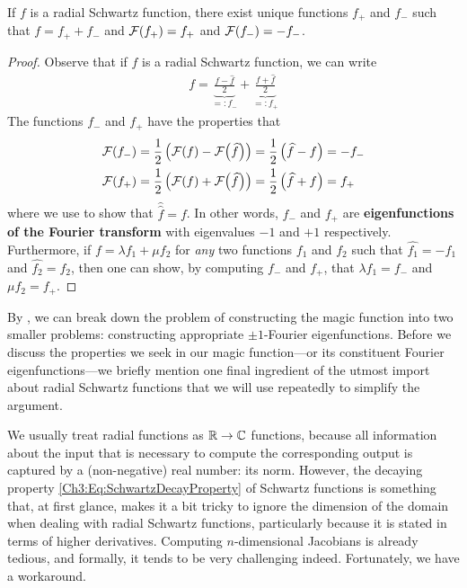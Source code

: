 \begin{boxtheorem}\label{Ch3:Thm:RadialSchwartz_eq_unique_sum_pm1_eigfun}
    If $f$ is a radial Schwartz function, there exist unique functions $f_+$ and $f_-$ such that $f = f_+ + f_-$ and $\mathcal{F}\!\left( f_+ \right) = f_+$ and $\mathcal{F}\!\left( f_- \right) = -f_-$.
\end{boxtheorem}
\begin{proof}
    Observe that if $f$ is a radial Schwartz function, we can write
    \begin{align*}
        f = \underbrace{\frac{f - \hat{f}}{2}}_{=: f_{-}} + \underbrace{\frac{f + \hat{f}}{2}}_{=: f_{+}}
    \end{align*}
    The functions $f_{-}$ and $f_{+}$ have the properties that
    \begin{align*}
        \mathcal{F}\!\left( f_{-} \right) &= \frac{1}{2} \left( \mathcal{F}\!\left( f \right) - \mathcal{F}\!\left( \widehat{f} \right) \right) = \frac{1}{2} \left( \widehat{f} - f \right) = -f_{-} \\
        \mathcal{F}\!\left( f_{+} \right) &= \frac{1}{2} \left( \mathcal{F}\!\left( f \right) + \mathcal{F}\!\left( \widehat{f} \right) \right) = \frac{1}{2} \left( \widehat{f} + f \right) = f_{+}
    \end{align*}
    where we use  to show that $\hat{\hat{f}} = f$. In other words, $f_{-}$ and $f_{+}$ are \textbf{eigenfunctions of the Fourier transform} with eigenvalues $-1$ and $+1$ respectively. Furthermore, if $f = \lambda f_1 + \mu f_2$ for \textit{any} two functions $f_1$ and $f_2$ such that $\hat{f_1} = -f_1$ and $\hat{f_2} = f_2$, then one can show, by computing $f_{-}$ and $f_{+}$, that $\lambda f_1 = f_{-}$ and $\mu f_2 = f_{+}$.
\end{proof}

By , we can break down the problem of constructing the magic function into two smaller problems: constructing appropriate $\pm 1$-Fourier eigenfunctions. Before we discuss the properties we seek in our magic function---or its constituent Fourier eigenfunctions---we briefly mention one final ingredient of the utmost import about radial Schwartz functions that we will use repeatedly to simplify the argument.

We usually treat radial functions as $\mathbb{R} \to \mathbb{C}$ functions, because all information about the input that is necessary to compute the corresponding output is captured by a (non-negative) real number: its norm. However, the decaying property \eqref{Ch3:Eq:SchwartzDecayProperty} of Schwartz functions is something that, at first glance, makes it a bit tricky to ignore the dimension of the domain when dealing with radial Schwartz functions, particularly because it is stated in terms of higher derivatives. Computing $n$-dimensional Jacobians is already tedious, and formally, it tends to be very challenging indeed. Fortunately, we have a workaround.

